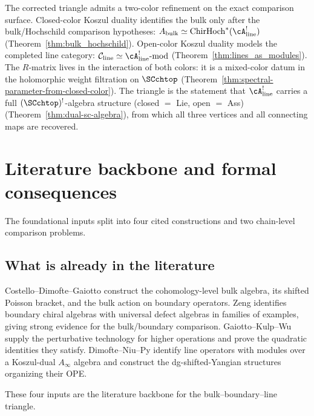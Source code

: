 \begin{remark}
The corrected triangle admits a two-color refinement on the exact
comparison surface. Closed-color Koszul duality identifies the bulk
only after the bulk/Hochschild comparison hypotheses:
$A_{\mathrm{bulk}} \simeq \mathrm{ChirHoch}^\ast(\cA^!_{\mathrm{line}})$
(Theorem~\ref{thm:bulk_hochschild}).
Open-color Koszul duality models the completed line category:
$\mathcal{C}_{\mathrm{line}} \simeq \cA^!_{\mathrm{line}}\text{-mod}$
(Theorem~\ref{thm:lines_as_modules}).
The $R$-matrix lives in the interaction of both colors:
it is a mixed-color datum in the holomorphic weight
filtration on $\SCchtop$ (Theorem~\ref{thm:spectral-parameter-from-closed-color}).
The triangle is the statement that $\cA^!_{\mathrm{line}}$ carries a full
$(\SCchtop)^{!}$-algebra structure (closed $=$ Lie, open $=$ Ass)
(Theorem~\ref{thm:dual-sc-algebra}), from which all three
vertices and all connecting maps are recovered.
\end{remark}

\section{Literature backbone and formal consequences}%

The foundational inputs split into four cited constructions and two
chain-level comparison problems.

\subsection{What is already in the literature}

Costello--Dimofte--Gaiotto \cite{CDG20} construct the cohomology-level bulk algebra, its shifted Poisson bracket, and the bulk action on boundary operators. Zeng \cite{Zeng23} identifies boundary chiral algebras with universal defect algebras in families of examples, giving strong evidence for the bulk/boundary comparison. Gaiotto--Kulp--Wu \cite{GKW24} supply the perturbative technology for higher operations and prove the quadratic identities they satisfy. Dimofte--Niu--Py \cite{DNP25} identify line operators with modules over a Koszul-dual $A_\infty$ algebra and construct the dg-shifted-Yangian structures organizing their OPE.

These four inputs are the literature backbone for the bulk--boundary--line
triangle.

